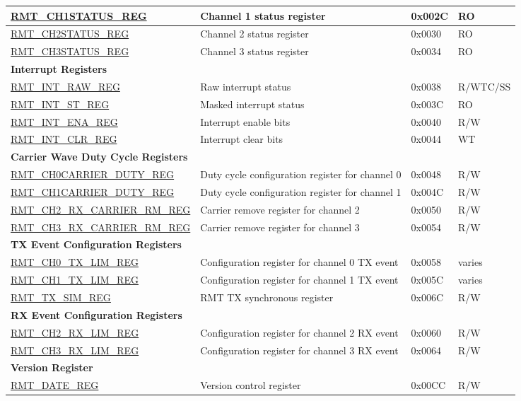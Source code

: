 \begin{longtable}{ | p{5.5cm} | p{6.8cm} | p{1.3cm} | p{1.5cm} | }
\hyperref[regdesc:RMTCHNSTATUSREG]{RMT\_CH1STATUS\_REG} & Channel 1 status register & 0x002C & RO \\ \hline
\hyperref[regdesc:RMTCHMSTATUSREG]{RMT\_CH2STATUS\_REG} & Channel 2 status register & 0x0030 & RO \\ \hline
\hyperref[regdesc:RMTCHMSTATUSREG]{RMT\_CH3STATUS\_REG} & Channel 3 status register & 0x0034 & RO \\ \hline
\multicolumn{4}{|l|}{\textbf{Interrupt Registers}} \\ \hline
\hyperref[regdesc:RMTINTRAWREG]{RMT\_INT\_RAW\_REG} & Raw interrupt status & 0x0038 & R/WTC/SS \\ \hline
\hyperref[regdesc:RMTINTSTREG]{RMT\_INT\_ST\_REG} & Masked interrupt status & 0x003C & RO \\ \hline
\hyperref[regdesc:RMTINTENAREG]{RMT\_INT\_ENA\_REG} & Interrupt enable bits & 0x0040 & R/W \\ \hline
\hyperref[regdesc:RMTINTCLRREG]{RMT\_INT\_CLR\_REG} & Interrupt clear bits & 0x0044 & WT \\ \hline
\multicolumn{4}{|l|}{\textbf{Carrier Wave Duty Cycle Registers}} \\ \hline
\hyperref[regdesc:RMTCHNCARRIERDUTYREG]{RMT\_CH0CARRIER\_DUTY\_REG} & Duty cycle configuration register for channel 0 & 0x0048 & R/W \\ \hline
\hyperref[regdesc:RMTCHNCARRIERDUTYREG]{RMT\_CH1CARRIER\_DUTY\_REG} & Duty cycle configuration register for channel 1 & 0x004C & R/W \\ \hline
\hyperref[regdesc:RMTCHMRXCARRIERRMREG]{RMT\_CH2\_RX\_CARRIER\_RM\_REG} & Carrier remove register for channel 2 & 0x0050 & R/W \\ \hline
\hyperref[regdesc:RMTCHMRXCARRIERRMREG]{RMT\_CH3\_RX\_CARRIER\_RM\_REG} & Carrier remove register for channel 3 & 0x0054 & R/W \\ \hline
\multicolumn{4}{|l|}{\textbf{TX Event Configuration Registers}} \\ \hline
\hyperref[regdesc:RMTCHNTXLIMREG]{RMT\_CH0\_TX\_LIM\_REG} & Configuration register for channel 0 TX event & 0x0058 & varies \\ \hline
\hyperref[regdesc:RMTCHNTXLIMREG]{RMT\_CH1\_TX\_LIM\_REG} & Configuration register for channel 1 TX event & 0x005C & varies \\ \hline
\hyperref[regdesc:RMTTXSIMREG]{RMT\_TX\_SIM\_REG} & RMT TX synchronous register & 0x006C & R/W \\ \hline
\multicolumn{4}{|l|}{\textbf{RX Event Configuration Registers}} \\ \hline
\hyperref[regdesc:RMTCHMRXLIMREG]{RMT\_CH2\_RX\_LIM\_REG} & Configuration register for channel 2 RX event & 0x0060 & R/W \\ \hline
\hyperref[regdesc:RMTCHMRXLIMREG]{RMT\_CH3\_RX\_LIM\_REG} & Configuration register for channel 3 RX event & 0x0064 & R/W \\ \hline
\multicolumn{4}{|l|}{\textbf{Version Register}} \\ \hline
\hyperref[regdesc:RMTDATEREG]{RMT\_DATE\_REG} & Version control register & 0x00CC & R/W \\ \hline
\end{longtable}
